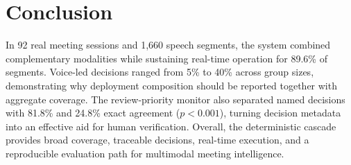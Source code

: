 \documentclass[conference]{IEEEtran}
\begin{document}
\section{Conclusion}

In 92 real meeting sessions and 1{,}660 speech segments, the system
combined complementary modalities while sustaining real-time operation
for 89.6\% of segments. Voice-led decisions ranged from 5\% to 40\%
across group sizes, demonstrating why deployment composition should be
reported together with aggregate coverage. The review-priority monitor
also separated named decisions with 81.8\% and 24.8\% exact agreement
($p<0.001$), turning decision metadata into an effective aid for human
verification. Overall, the deterministic cascade provides broad
coverage, traceable decisions, real-time execution, and a reproducible
evaluation path for multimodal meeting intelligence.

%
%
%



\end{document}
